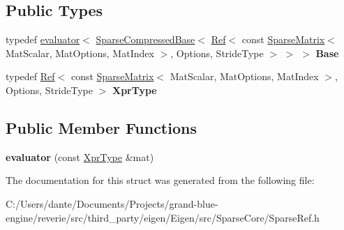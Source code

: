 \subsection*{Public Types}
\begin{DoxyCompactItemize}
\item 
\mbox{\label{struct_eigen_1_1internal_1_1evaluator_3_01_ref_3_01const_01_sparse_matrix_3_01_mat_scalar_00_01_17d98bf798af280639e961c8a27d545c_ad7d1a3ff18d6498379c096d8b5cff774}} 
typedef \mbox{\hyperlink{struct_eigen_1_1internal_1_1evaluator}{evaluator}}$<$ \mbox{\hyperlink{class_eigen_1_1_sparse_compressed_base}{Sparse\+Compressed\+Base}}$<$ \mbox{\hyperlink{class_eigen_1_1_ref}{Ref}}$<$ const \mbox{\hyperlink{class_eigen_1_1_sparse_matrix}{Sparse\+Matrix}}$<$ Mat\+Scalar, Mat\+Options, Mat\+Index $>$, Options, Stride\+Type $>$ $>$ $>$ {\bfseries Base}
\item 
\mbox{\label{struct_eigen_1_1internal_1_1evaluator_3_01_ref_3_01const_01_sparse_matrix_3_01_mat_scalar_00_01_17d98bf798af280639e961c8a27d545c_a2a5dc1b12140b3dad3364313fa7513bb}} 
typedef \mbox{\hyperlink{class_eigen_1_1_ref}{Ref}}$<$ const \mbox{\hyperlink{class_eigen_1_1_sparse_matrix}{Sparse\+Matrix}}$<$ Mat\+Scalar, Mat\+Options, Mat\+Index $>$, Options, Stride\+Type $>$ {\bfseries Xpr\+Type}
\end{DoxyCompactItemize}
\subsection*{Public Member Functions}
\begin{DoxyCompactItemize}
\item 
\mbox{\label{struct_eigen_1_1internal_1_1evaluator_3_01_ref_3_01const_01_sparse_matrix_3_01_mat_scalar_00_01_17d98bf798af280639e961c8a27d545c_a2be495809edfd3a900007c5d5b6ad7c5}} 
{\bfseries evaluator} (const \mbox{\hyperlink{class_eigen_1_1_ref_3_01const_01_sparse_matrix_3_01_mat_scalar_00_01_mat_options_00_01_mat_index1bbfd78857ba9c14d54178cb3009ac38}{Xpr\+Type}} \&mat)
\end{DoxyCompactItemize}


The documentation for this struct was generated from the following file\+:\begin{DoxyCompactItemize}
\item 
C\+:/\+Users/dante/\+Documents/\+Projects/grand-\/blue-\/engine/reverie/src/third\+\_\+party/eigen/\+Eigen/src/\+Sparse\+Core/Sparse\+Ref.\+h\end{DoxyCompactItemize}
